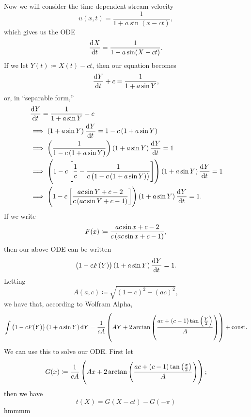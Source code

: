 \documentclass{article}
\begin{document}
Now we will consider the time-dependent stream velocity
%
\begin{equation*}
    u(x, t) = \frac{1}{1 + a \sin (x - c t)}
    ,
\end{equation*}
%
which gives us the ODE
%
\begin{equation*}
    \dod{X}{t} = \frac{1}{1 + a \sin (X - c t)}
    .
\end{equation*}
%
If we let $Y(t) \coloneqq X(t) - c t$, then our equation becomes
%
\begin{equation*}
    \dod{Y}{t} + c = \frac{1}{1 + a \sin Y}
    ,
\end{equation*}
%
or, in ``separable form,''
%
\begin{align*}
    &\dod{Y}{t} = \frac{1}{1 + a \sin Y} - c \\
    &\implies \del{1 + a \sin Y} \dod{Y}{t} = 1 - c \del{1 + a \sin Y} \\
    &\implies \del{\frac{1}{1 - c \del{1 + a \sin Y}}} \del{1 + a \sin Y} \dod{Y}{t} = 1 \\
    &\implies \del{1 - c \sbr{\frac{1}{c} - \frac{1}{c \del{1 - c \del{1 + a \sin Y}}}}} \del{1 + a \sin Y} \dod{Y}{t} = 1 \\
    &\implies \del{1 - c \sbr{\frac{a c \sin Y + c - 2}{c \del{a c \sin Y + c - 1}}}} \del{1 + a \sin Y} \dod{Y}{t} = 1
    .
\end{align*}
%
If we write
%
\begin{equation*}
    F(x) \coloneqq \frac{a c \sin x + c - 2}{c \del{a c \sin x + c - 1}}
    ,
\end{equation*}
%
then our above ODE can be written
%
\begin{equation*}
    \del{1 - c F(Y)} \del{1 + a \sin Y} \dod{Y}{t} = 1
    .
\end{equation*}
%
Letting
%
\begin{equation*}
    A(a, c) \coloneqq \sqrt{(1 - c)^2 - (ac)^2}
    ,
\end{equation*}
%
we have that, according to Wolfram Alpha,
%
\begin{equation*}
    \int \del{1 - c F(Y)} \del{1 + a \sin Y} \dif {Y}
        = \frac{1}{c A}
        \del{
            A Y + 2 \arctan
                \del{\frac{a c + (c - 1) \tan \del{\frac{Y}{2}}}{A}}
            } + \text{const}
    .
\end{equation*}
%
We can use this to solve our ODE. First let
%
\begin{equation*}
    G(x) \coloneqq
        \frac{1}{c A}
        \del{
            A x + 2 \arctan
                \del{\frac{a c + (c - 1) \tan \del{\frac{x}{2}}}{A}}
            }
    ;
\end{equation*}
%
then we have
%
\begin{equation*}
    t(X) = G(X - c t) - G(-\pi)
\end{equation*}
%
hmmmm
\end{document}
